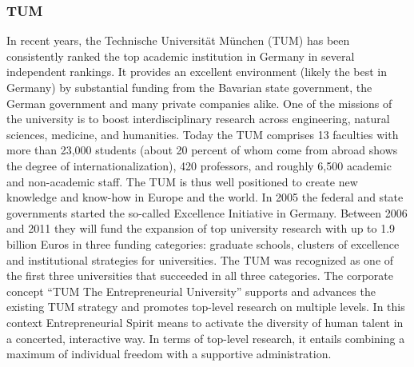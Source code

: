 \subsubsection{TUM}
In  recent years, the  Technische Universit\"at  M\"unchen (TUM)  has been
consistently ranked the top academic institution in Germany in several
independent rankings. It provides an excellent environment (likely the
best  in  Germany) by  substantial  funding  from  the Bavarian  state
government,   the  German  government   and  many   private  companies
alike.  One   of  the   missions  of  the   university  is   to  boost
interdisciplinary  research   across  engineering,  natural  sciences,
medicine, and  humanities. Today the  TUM comprises 13  faculties with
more than 23,000  students (about 20 percent of  whom come from abroad
shows the degree of internationalization), 420 professors, and roughly
6,500 academic  and non-academic staff. The TUM is thus well
positioned  to create  new knowledge  and know-how  in Europe  and the
world.  In  2005  the  federal  and  state  governments  started  the
so-called Excellence Initiative in Germany. Between 2006 and 2011 they
will  fund the expansion  of top  university research  with up  to 1.9
billion Euros in three  funding categories: graduate schools, clusters
of excellence  and institutional strategies for  universities. The TUM
was recognized as  one of the first three  universities that succeeded
in   all   three  categories.    The   corporate   concept  ``TUM   The
Entrepreneurial  University'' supports  and advances  the  existing TUM
strategy and  promotes top-level research on multiple  levels. In this
context Entrepreneurial  Spirit means  to activate the  diversity of
human talent  in a concerted,  interactive way. In terms  of top-level
research, it entails combining a  maximum of individual freedom with a
supportive administration.

